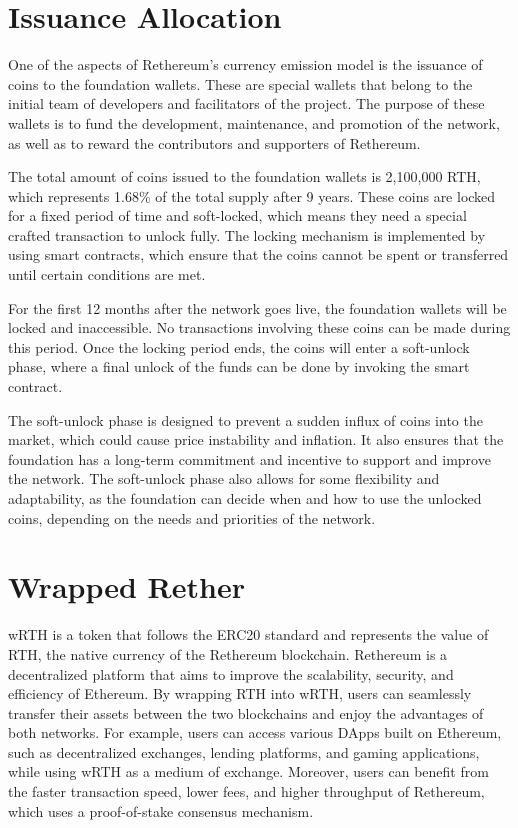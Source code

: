 \documentclass[a4paper,onecolumn, superscriptaddress,10pt,accepted=2020-05-01,issue=1, volume=2, shorttitle=papers]{compositionalityarticle}
\begin{document}
\section{Issuance Allocation}

One of the aspects of Rethereum’s currency emission model is the issuance of coins to the foundation wallets. These are special wallets that belong to the initial team of developers and facilitators of the project. The purpose of these wallets is to fund the development, maintenance, and promotion of the network, as well as to reward the contributors and supporters of Rethereum.

\vspace{0.3cm}

The total amount of coins issued to the foundation wallets is 2,100,000 RTH, which represents 1.68\% of the total supply after 9 years. These coins are locked for a fixed period of time and soft-locked, which means they need a special crafted transaction to unlock fully. The locking mechanism is implemented by using smart contracts, which ensure that the coins cannot be spent or transferred until certain conditions are met.

\vspace{0.3cm}

For the first 12 months after the network goes live, the foundation wallets will be locked and inaccessible. No transactions involving these coins can be made during this period. Once the locking period ends, the coins will enter a soft-unlock phase, where a final unlock of the funds can be done by invoking the smart contract.


\vspace{0.3cm}

The soft-unlock phase is designed to prevent a sudden influx of coins into the market, which could cause price instability and inflation. It also ensures that the foundation has a long-term commitment and incentive to support and improve the network. The soft-unlock phase also allows for some flexibility and adaptability, as the foundation can decide when and how to use the unlocked coins, depending on the needs and priorities of the network.

\vspace{0.3cm}

\section{Wrapped Rether}

wRTH is a token that follows the ERC20 standard and represents the value of RTH, the native currency of the Rethereum blockchain. Rethereum is a decentralized platform that aims to improve the scalability, security, and efficiency of Ethereum. By wrapping RTH into wRTH, users can seamlessly transfer their assets between the two blockchains and enjoy the advantages of both networks. For example, users can access various DApps built on Ethereum, such as decentralized exchanges, lending platforms, and gaming applications, while using wRTH as a medium of exchange. Moreover, users can benefit from the faster transaction speed, lower fees, and higher throughput of Rethereum, which uses a proof-of-stake consensus mechanism.
\end{document}

